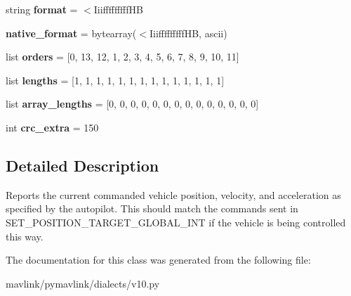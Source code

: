 \begin{DoxyCompactItemize}
\item 
\mbox{\label{classpymavlink_1_1dialects_1_1v10_1_1MAVLink__position__target__global__int__message_a946675ee6a45e5aeae7a9c3705a61f00}} 
string {\bfseries format} = \textquotesingle{}$<$Iiifffffffff\+HB\textquotesingle{}
\item 
\mbox{\label{classpymavlink_1_1dialects_1_1v10_1_1MAVLink__position__target__global__int__message_adfb026e31683fcfe17802c2021f9d607}} 
{\bfseries native\+\_\+format} = bytearray(\textquotesingle{}$<$Iiifffffffff\+HB\textquotesingle{}, \textquotesingle{}ascii\textquotesingle{})
\item 
\mbox{\label{classpymavlink_1_1dialects_1_1v10_1_1MAVLink__position__target__global__int__message_aecef6a2d7d7f75f68478236e3622669f}} 
list {\bfseries orders} = \mbox{[}0, 13, 12, 1, 2, 3, 4, 5, 6, 7, 8, 9, 10, 11\mbox{]}
\item 
\mbox{\label{classpymavlink_1_1dialects_1_1v10_1_1MAVLink__position__target__global__int__message_aecc0f42e38da44048014173581265289}} 
list {\bfseries lengths} = \mbox{[}1, 1, 1, 1, 1, 1, 1, 1, 1, 1, 1, 1, 1, 1\mbox{]}
\item 
\mbox{\label{classpymavlink_1_1dialects_1_1v10_1_1MAVLink__position__target__global__int__message_a746e73d5f677670508caec96f0651ad8}} 
list {\bfseries array\+\_\+lengths} = \mbox{[}0, 0, 0, 0, 0, 0, 0, 0, 0, 0, 0, 0, 0, 0\mbox{]}
\item 
\mbox{\label{classpymavlink_1_1dialects_1_1v10_1_1MAVLink__position__target__global__int__message_a8287f5ff6e0b1ee2e3f09b73643d640a}} 
int {\bfseries crc\+\_\+extra} = 150
\end{DoxyCompactItemize}


\subsection{Detailed Description}
\begin{DoxyVerb}Reports the current commanded vehicle position, velocity, and
acceleration as specified by the autopilot. This should match
the commands sent in SET_POSITION_TARGET_GLOBAL_INT if the
vehicle is being controlled this way.
\end{DoxyVerb}
 

The documentation for this class was generated from the following file\+:\begin{DoxyCompactItemize}
\item 
mavlink/pymavlink/dialects/v10.\+py\end{DoxyCompactItemize}
